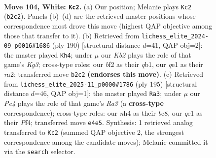 \documentclass[11pt]{article}
\begin{document}
\clearpage

\begin{figure}[p]\centering
\begin{subfigure}{0.46\textwidth}\centering
\resizebox{\linewidth}{!}{%
\newchessgame
\chessboard[
  setfen={5k2/1Nn5/8/8/Pp2P2n/8/BK3b1p/4q3 w - - 0 104},
  showmover=false,
  pgfstyle=straightmove, color=movearrow, markmove={b2-c2}
]}
\caption{}
\end{subfigure}\hfill
\begin{subfigure}{0.46\textwidth}\centering
\resizebox{\linewidth}{!}{%
\newchessgame
\chessboard[
  setfen={8/7p/5k2/2p2b2/2P2P2/6K1/r7/1q6 w - - 0 96},
  showmover=false,
  pgfstyle=straightmove, color=movearrow, markmove={g3-h4}
]}
\caption{}
\end{subfigure}
\\[4pt]
\begin{subfigure}{0.46\textwidth}\centering
\resizebox{\linewidth}{!}{%
\newchessgame
\chessboard[
  setfen={2B5/8/r7/2k4b/5p1p/2N4P/5K2/8 b - - 5 98},
  showmover=false,
  pgfstyle=straightmove, color=movearrow, markmove={a6-a3}
]}
\caption{}
\end{subfigure}\hfill

\caption{\textbf{Move 104, White: \texttt{Kc2}.} (a) Our position; Melanie plays \texttt{Kc2} (\texttt{b2c2}). Panels (b)--(d) are the retrieved master positions whose correspondence most drove this move (highest QAP objective among those that transfer to it). (b) Retrieved from \texttt{lichess\_elite\_2024-09\_p0016\#1686} (ply 190) [structural distance $d$=41, QAP obj=2]: the master played \texttt{Kh4}; under $\mu$ our \emph{Kb2} plays the role of that game's \emph{Kg3}; cross-type roles: our \emph{b}f2 as their \emph{q}b1, our \emph{q}e1 as their \emph{r}a2; transferred move \texttt{b2c2} \textbf{(endorses this move)}. (c) Retrieved from \texttt{lichess\_elite\_2025-11\_p0000\#1786} (ply 195) [structural distance $d$=46, QAP obj=1]: the master played \texttt{Ra3}; under $\mu$ our \emph{Pe4} plays the role of that game's \emph{Ra3} (a \textbf{cross-type} correspondence); cross-type roles: our \emph{n}h4 as their \emph{b}c8, our \emph{q}e1 as their \emph{P}f4; transferred move \texttt{e4e5}. Synthesis: 1 retrieved analog transferred to \texttt{Kc2} (summed QAP objective 2, the strongest correspondence among the candidate moves); Melanie committed it via the \texttt{search} selector.}
\label{fig:thought-m206}
\end{figure}

\clearpage
\end{document}
